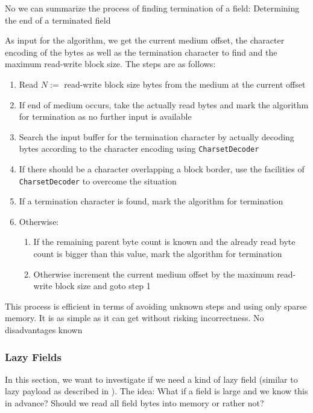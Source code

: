 No we can summarize the process of finding termination of a field:
{%
Determining the end of a terminated field
}
{%
  As input for the algorithm, we get the current medium offset, the character encoding of the bytes as well as the termination character to find and the maximum read-write block size. The steps are as follows:
  \begin{enumerate}
  \item Read $N:=$ read-write block size bytes from the medium at the current offset
  \item If end of medium occurs, take the actually read bytes and mark the algorithm for termination as no further input is available
  \item Search the input buffer for the termination character by actually decoding bytes according to the character encoding using \texttt{CharsetDecoder}
  \item If there should be a character overlapping a block border, use the facilities of \texttt{CharsetDecoder} to overcome the situation
  \item If a termination character is found, mark the algorithm for termination
  \item Otherwise:
    \begin{enumerate}
    \item If the remaining parent byte count is known and the already read byte count is bigger than this value, mark the algorithm for termination 
    \item Otherwise increment the current medium offset by the maximum read-write block size and goto step 1
    \end{enumerate}
  \end{enumerate}
}
{%
This process is efficient in terms of avoiding unknown steps and using only sparse memory. It is as simple as it can get without risking incorrectness.
}
{%
No disadvantages known
}

\subsubsection{Lazy Fields}%
\label{sec:LazyFields}%

In this section, we want to investigate if we need a kind of lazy field (similar to lazy payload as described in ). The idea: What if a field is large and we know this in advance? Should we read all field bytes into memory or rather not?

